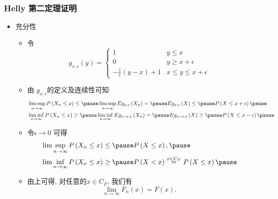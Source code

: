 \documentclass[Prob-All.tex]{subfiles}
\begin{document}
\begin{frame}
	\frametitle{{\rm Helly} 第二定理证明}
	\begin{itemize}[<+-|alert@+>]
	\item 充分性
	\begin{itemize}[<+-|alert@+>]
		\item 令\[
			g_{x, \epsilon}(y)=\left\{\begin{array}{ll}
			1 & y \leq x \\
			0 & y \geq x+\epsilon \\
			-\frac{1}{\epsilon}(y-x)+1 & x \leq y \leq x+\epsilon
			\end{array}\right.
			\]
		\item 由 $g_{x, \epsilon} $的定义及连续性可知 %
    \begin{align*}
		&\limsup _{n \rightarrow \infty} P\left(X_{n} \leq x\right) \leq  \pause \limsup _{n \rightarrow \infty} E g_{x, \epsilon}\left(X_{n}\right)=\pause E g_{x, \epsilon}\left(X\right) \leq \pause P\left(X \leq x+\epsilon\right) \pause \\
		&\liminf _{n \rightarrow \infty} P\left(X_{n} \leq x\right) \geq \pause \liminf _{n \rightarrow \infty} E g_{x-\epsilon, \epsilon}\left(X_{n}\right)=\pause E g_{x-\epsilon, \epsilon}\left(X\right) \geq \pause P\left(X\leq x-\epsilon\right) \pause
	\end{align*}
	\item 令\( \epsilon \rightarrow 0 \) 可得
	\begin{align*}
		&\lim \sup _{n \rightarrow \infty} P\left(X_{n} \leq x\right) \leq  \pause P\left(X\leq x\right), \pause \\
		&\lim \inf _{n \rightarrow \infty} P\left(X_{n} \leq x\right) \geq  \pause P\left(X<x\right)\stackrel{x\in C_F}{=}P\left(X \leq x\right)\pause
	\end{align*}

	 \item 由上可得, 对任意的$x\in C_F$, 我们有
	 \[\lim _{n\rightarrow \infty} F_{n}(x)=F(x).\]
		\end{itemize}
	\end{itemize}

\end{frame}
\end{document}
